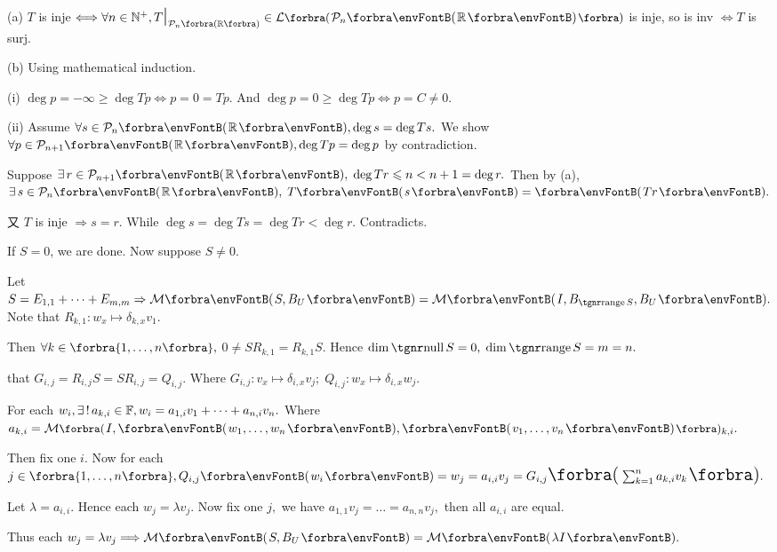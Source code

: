 (a) $T$ is inje $\Longleftrightarrow\forall n\in\Nbp,T\mmid_{\PoR[\SmallPar]{n}}\in\Lm[\BigPar]{\PoR{n}}$ is inje, so is inv $\Longleftrightarrow T$ is surj.\par\quad
(b) Using mathematical induction.\par\quad
(i) $\deg p=-\infty\geqslant\deg Tp\Longleftrightarrow p=0=Tp.$ And $\deg p=0\geqslant\deg Tp\Longleftrightarrow p=C\neq 0.$\par\vspace{2pt}\quad\Endi
(ii) Assume $\forall s\in\PoR{n},\deg s=\deg Ts.$ We show $\forall p\in\Po_{n+1}\Par{\Rbb},\deg Tp=\deg p$ by contradiction.\par\quad\Hii
Suppose $\exists\,r\in\PoR{n+1},\;\deg Tr\leqslant n<n+1=\deg r.$ Then by (a), $\exists\,s\in\Po_{n}\Par{\Rbb},\;T\Par{s}=\Par{Tr}.$\par\quad\Hii
又 $T$ is inje $\Rightarrow s=r.$ While $\deg s=\deg Ts=\deg Tr<\deg r.$ Contradicts.\PfEnd
\SepLine

If $S=0$, we are done. Now suppose $S\neq 0.$\par\quad
{\vspace{2pt}Let {$S=E_{1,1}+\dots+E_{m,m}\Rightarrow \Mt{S,B_U}=\Mt{I,B_{\range S},B_U}.$} Note that $R_{k,1}:w_x\mapsto\delta_{k,x}v_1.$}\par\quad
{\vspace{2pt}Then $\forall k\in\Bra{1,\dots,n},$ {\Large\envFontLarge$0\neq SR_{k,1}=R_{k,1}S.$} Hence $\dim\null S=0,\;\dim\range S=m=n.$}\par\quad
{\vspace{2pt}\NOTICE that {\Large\envFontLarge$G_{i,j}=R_{i,j}S=SR_{i,j}=Q_{i,j}$}. Where $G_{i,j}:v_x\mapsto\delta_{i,x}v_j;\;Q_{i,j}:w_x\mapsto\delta_{i,x}w_j.$}\par\quad
For each $w_i,\exists\,!\,a_{k,i}\in{\mathbb{F}},w_i=a_{1,i}v_1+\dots+a_{n,i}v_n.$ Where $a_{k,i}=\Mt[\BigPar]{I,\Par{w_1,\dots,w_n},\Par{v_1,\dots,v_n}}{_{k,i}}.$\par\quad
Then fix one $i.$ Now for each $j\in\Bra{1,\dots,n},Q_{i,j}\Par{w_i}=w_j=a_{i,i}v_j=G_{i,j}\envFontLarge\BigPar{\sum_{k=1}^na_{k,i} v_k}.$\par\quad
Let $\lambda=a_{i,i}.$ Hence each $w_j=\lambda v_j.$ Now fix one $j,$ we have $a_{1,1}v_j=\dots=a_{n,n}v_j,$ then all $a_{i,i}$ are equal.\par\quad
Thus each $w_j=\lambda v_j\Longrightarrow\Mt{S,B_U}=\Mt{\lambda I}.$\PfEnd
\SepLine

